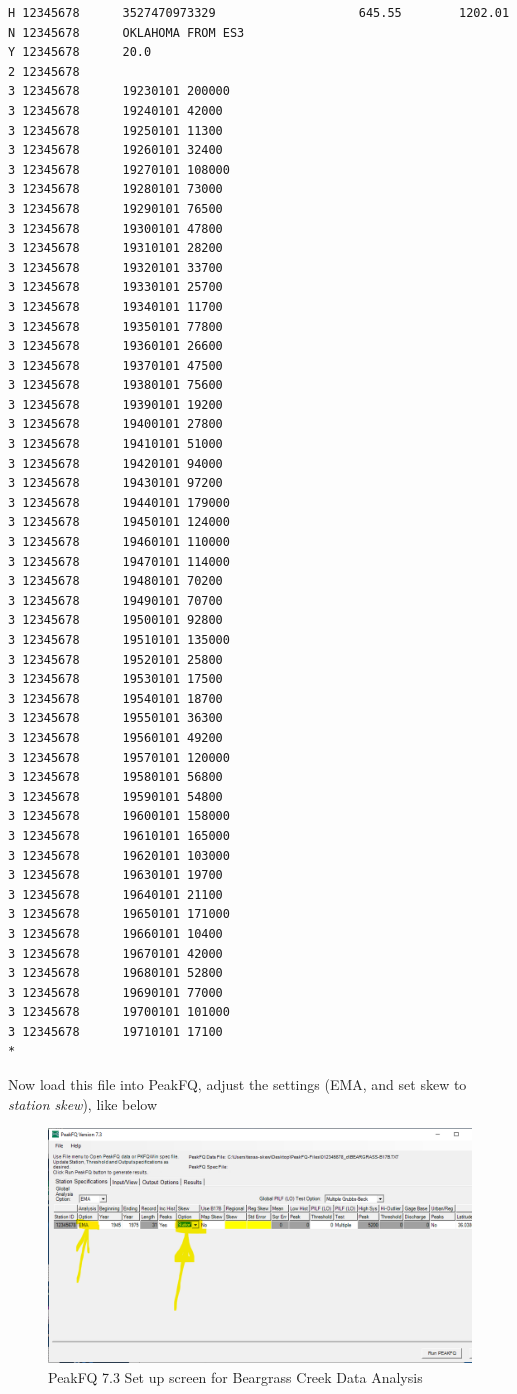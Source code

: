 \documentclass[12pt]{article}
\begin{document}
\begin{enumerate}
\begin{verbatim}
H 12345678      3527470973329                    645.55        1202.01
N 12345678      OKLAHOMA FROM ES3
Y 12345678      20.0
2 12345678
3 12345678      19230101 200000
3 12345678      19240101 42000
3 12345678      19250101 11300
3 12345678      19260101 32400
3 12345678      19270101 108000
3 12345678      19280101 73000
3 12345678      19290101 76500
3 12345678      19300101 47800
3 12345678      19310101 28200
3 12345678      19320101 33700
3 12345678      19330101 25700
3 12345678      19340101 11700
3 12345678      19350101 77800
3 12345678      19360101 26600
3 12345678      19370101 47500
3 12345678      19380101 75600
3 12345678      19390101 19200
3 12345678      19400101 27800
3 12345678      19410101 51000
3 12345678      19420101 94000
3 12345678      19430101 97200
3 12345678      19440101 179000
3 12345678      19450101 124000
3 12345678      19460101 110000
3 12345678      19470101 114000
3 12345678      19480101 70200
3 12345678      19490101 70700
3 12345678      19500101 92800
3 12345678      19510101 135000
3 12345678      19520101 25800
3 12345678      19530101 17500
3 12345678      19540101 18700
3 12345678      19550101 36300
3 12345678      19560101 49200
3 12345678      19570101 120000
3 12345678      19580101 56800
3 12345678      19590101 54800
3 12345678      19600101 158000
3 12345678      19610101 165000
3 12345678      19620101 103000
3 12345678      19630101 19700
3 12345678      19640101 21100
3 12345678      19650101 171000
3 12345678      19660101 10400
3 12345678      19670101 42000
3 12345678      19680101 52800
3 12345678      19690101 77000
3 12345678      19700101 101000
3 12345678      19710101 17100         
*
\end{verbatim}

Now load this file into PeakFQ, adjust the settings (EMA, and set skew to \textsl{station skew}), like below

\begin{figure}[h!] %
   \centering
   \includegraphics[width=6in]{BeargrassPFQSetuo.png} 
   \caption{PeakFQ 7.3 Set up screen for Beargrass Creek Data Analysis}
   \label{fig:BeargrassPFQSetuo}
\end{figure}


\end{enumerate}
\end{document}
